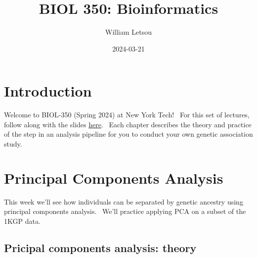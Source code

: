 \documentclass[
]{book}
\title{BIOL 350: Bioinformatics}
\author{William Letsou}
\date{2024-03-21}
\begin{document}
\maketitle

{
\setcounter{tocdepth}{1}
\tableofcontents
}
\hypertarget{intro}{%
\chapter{Introduction}\label{intro}}

Welcome to BIOL-350 (Spring 2024) at New York Tech!~ For this set of lectures, follow along with the slides \href{https://wletsou.github.io/BIOL-350/Biol\%20350\%20slides.pdf}{here}.~ Each chapter describes the theory and practice of the step in an analysis pipeline for you to conduct your own genetic association study.

\hypertarget{principal-components-analysis}{%
\chapter{Principal Components Analysis}\label{principal-components-analysis}}

This week we'll see how individuals can be separated by genetic ancestry using principal components analysis.~ We'll practice applying PCA on a subset of the 1KGP data.

\hypertarget{pricipal-components-analysis-theory}{%
\section{Pricipal components analysis: theory}\label{pricipal-components-analysis-theory}}
\end{document}
